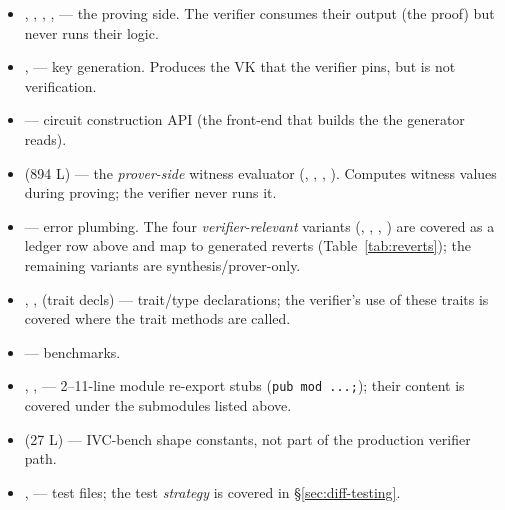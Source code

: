 \begin{itemize}[leftmargin=1.4em,itemsep=1pt]
  \item {},
        ,
        ,
        ,
         --- the proving side. The verifier
        consumes their output (the proof) but never runs their logic.
  \item {},
         --- key generation. Produces
        the VK that the verifier pins, but is not verification.
  \item {} --- circuit construction API (the
        front-end that builds the  the generator
        reads).
  \item {} (894 L) --- the \emph{prover-side}
        witness evaluator (, ,
        , ). Computes witness
        values during proving; the verifier never runs it.
  \item {} --- error plumbing. The four
        \emph{verifier-relevant} variants (,
        , ,
        ) are covered as a ledger row above and map to
        generated reverts (Table~\ref{tab:reverts}); the remaining
        variants are synthesis/prover-only.
  \item {}, ,
         (trait decls) --- trait/type
        declarations; the verifier's use of these traits is covered
        where the trait methods are called.
  \item {} --- benchmarks.
  \item {}, ,
         --- 2--11-line module re-export
        stubs (\texttt{pub mod ...;}); their content is covered under
        the submodules listed above.
  \item {} (27 L) --- IVC-bench shape constants,
        not part of the production verifier path.
  \item {},  --- test files;
        the test \emph{strategy} is covered in \S\ref{sec:diff-testing}.
\end{itemize}

